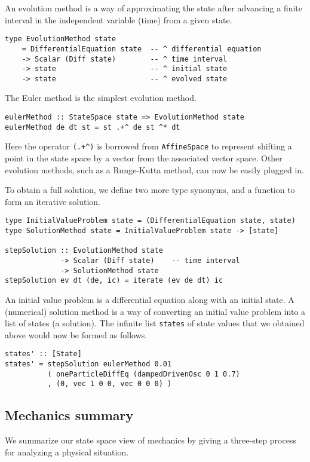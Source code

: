 \documentclass[11pt]{article}
\begin{document}
An evolution method is a way of approximating the state
after advancing a finite interval in the independent
variable (time) from a given state.
\begin{verbatim}
type EvolutionMethod state
    = DifferentialEquation state  -- ^ differential equation
    -> Scalar (Diff state)        -- ^ time interval
    -> state                      -- ^ initial state
    -> state                      -- ^ evolved state
\end{verbatim}
The Euler method is the simplest evolution method.
\begin{verbatim}
eulerMethod :: StateSpace state => EvolutionMethod state
eulerMethod de dt st = st .+^ de st ^* dt
\end{verbatim}
Here the operator \verb|(.+^)| is borrowed from \verb|AffineSpace|
to represent shifting a point in the state space by a vector from
the associated vector space.
Other evolution methods, such as a Runge-Kutta method, can
now be easily plugged in.

To obtain a full solution, we define two more type synonyms,
and a function to form an iterative solution.
\begin{verbatim}
type InitialValueProblem state = (DifferentialEquation state, state)
type SolutionMethod state = InitialValueProblem state -> [state]

stepSolution :: EvolutionMethod state
             -> Scalar (Diff state)    -- time interval
             -> SolutionMethod state
stepSolution ev dt (de, ic) = iterate (ev de dt) ic
\end{verbatim}
An initial value problem is a differential equation along with an initial state.
A (numerical) solution method is a way of converting
an initial value problem into a list of states (a solution).
The infinite list \verb|states| of state values that we obtained above would now be formed
as follows.
\begin{verbatim}
states' :: [State]
states' = stepSolution eulerMethod 0.01
          ( oneParticleDiffEq (dampedDrivenOsc 0 1 0.7)
          , (0, vec 1 0 0, vec 0 0 0) )
\end{verbatim}

\subsection{Mechanics summary}

We summarize our state space view of mechanics by giving a three-step
process for analyzing a physical situation.
\end{document}
